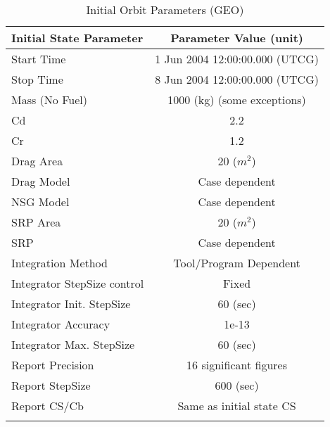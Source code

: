 \begin{table}[htbp!]
\centering \caption{Initial Orbit Parameters (GEO)}
      \begin{tabular}{lc}
      \hline\hline
            Initial State Parameter & Parameter Value (unit)\\
            \hline
            Start Time & 1 Jun 2004 12:00:00.000 (UTCG)\\
            Stop Time & 8 Jun 2004 12:00:00.000 (UTCG)\\
            
            Mass (No Fuel) & 1000 (kg) (some exceptions)\\
            Cd & 2.2\\
            Cr & 1.2\\
            Drag Area & 20 ($m^2$)\\
            Drag Model & Case dependent\\
            NSG Model & Case dependent\\
            SRP Area & 20 ($m^2$)\\
            SRP & Case dependent\\
            Integration Method & Tool/Program Dependent\\
            Integrator StepSize control & Fixed\\
            Integrator Init. StepSize & 60 (sec)\\
            Integrator Accuracy & 1e-13\\
            Integrator Max. StepSize & 60 (sec)\\
            Report Precision & 16 significant figures\\
            Report StepSize & 600 (sec)\\
            Report CS/Cb & Same as initial state CS\\
      \hline\hline
      \label{Table: InitStateGEO}
\end{tabular}
\end{table}


